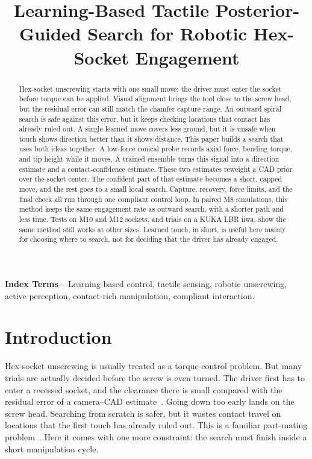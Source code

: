 \documentclass[letterpaper,10 pt,conference]{ieeeconf}
\title{\LARGE \bf
Learning-Based Tactile Posterior-Guided Search for Robotic Hex-Socket Engagement
}
\author{\mbox{}}
\begin{document}
\maketitle
\thispagestyle{empty}
\pagestyle{empty}

\begin{abstract}
Hex-socket unscrewing starts with one small move: the driver must enter the
socket before torque can be applied.  Visual alignment brings the tool close
to the screw head, but the residual error can still match the chamfer
capture range.  An outward spiral search is safe against this error, but it
keeps checking locations that contact has already ruled out.  A single
learned move covers less ground, but it is unsafe when touch shows direction
better than it shows distance.  This paper builds a search that uses both
ideas together.  A low-force conical probe records axial force, bending
torque, and tip height while it moves.  A trained ensemble turns this signal
into a direction estimate and a contact-confidence estimate.  These two
estimates reweight a CAD prior over the socket center.  The confident part
of that estimate becomes a short, capped move, and the rest goes to a small
local search.  Capture, recovery, force limits, and the final check all run
through one compliant control loop.  In paired M8 simulations, this method
keeps the same engagement rate as outward search, with a shorter path and
less time.  Tests on M10 and M12 sockets, and trials on a KUKA LBR iiwa,
show the same method still works at other sizes.  Learned touch, in short,
is useful here mainly for choosing where to search, not for deciding that
the driver has already engaged.
\end{abstract}

\noindent\textbf{Index Terms---}Learning-based control, tactile sensing,
robotic unscrewing, active perception, contact-rich manipulation, compliant
interaction.

\section{Introduction}

Hex-socket unscrewing is usually treated as a torque-control problem.  But
many trials are actually decided before the screw is even turned.  The
driver first has to enter a recessed socket, and the clearance there is
small compared with the residual error of a camera--CAD
estimate~\cite{diaz2025unscrewing}.  Going down too early lands on the screw
head.  Searching from scratch is safer, but it wastes contact travel on
locations that the first touch has already ruled out.  This is a familiar
part-mating problem~\cite{whitney1982quasistatic,lian2021benchmarking}.
Here it comes with one more constraint: the search must finish inside a
short manipulation cycle.
\end{document}
